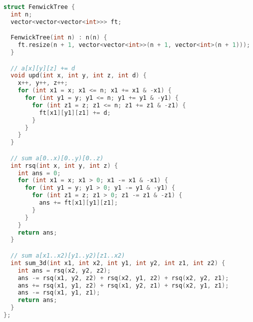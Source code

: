 \documentclass[10pt,a4paper,landscape,twosided]{extarticle}
\begin{document}
\begin{multicols*}{3}
\begin{lstlisting}[language=C++]
struct FenwickTree {
  int n;
  vector<vector<vector<int>>> ft;

  FenwickTree(int n) : n(n) {
    ft.resize(n + 1, vector<vector<int>>(n + 1, vector<int>(n + 1)));
  }

  // a[x][y][z] += d
  void upd(int x, int y, int z, int d) {
    x++, y++, z++;
    for (int x1 = x; x1 <= n; x1 += x1 & -x1) {
      for (int y1 = y; y1 <= n; y1 += y1 & -y1) {
        for (int z1 = z; z1 <= n; z1 += z1 & -z1) {
          ft[x1][y1][z1] += d;
        }
      }
    }
  }

  // sum a[0..x)[0..y)[0..z)
  int rsq(int x, int y, int z) {
    int ans = 0;
    for (int x1 = x; x1 > 0; x1 -= x1 & -x1) {
      for (int y1 = y; y1 > 0; y1 -= y1 & -y1) {
        for (int z1 = z; z1 > 0; z1 -= z1 & -z1) {
          ans += ft[x1][y1][z1];
        }
      }
    }
    return ans;
  }

  // sum a[x1..x2)[y1..y2)[z1..x2)
  int sum_3d(int x1, int x2, int y1, int y2, int z1, int z2) {
    int ans = rsq(x2, y2, z2);
    ans -= rsq(x1, y2, z2) + rsq(x2, y1, z2) + rsq(x2, y2, z1);
    ans += rsq(x1, y1, z2) + rsq(x1, y2, z1) + rsq(x2, y1, z1);
    ans -= rsq(x1, y1, z1);
    return ans;
  }
};
\end{lstlisting}


\end{multicols*}
\end{document}
